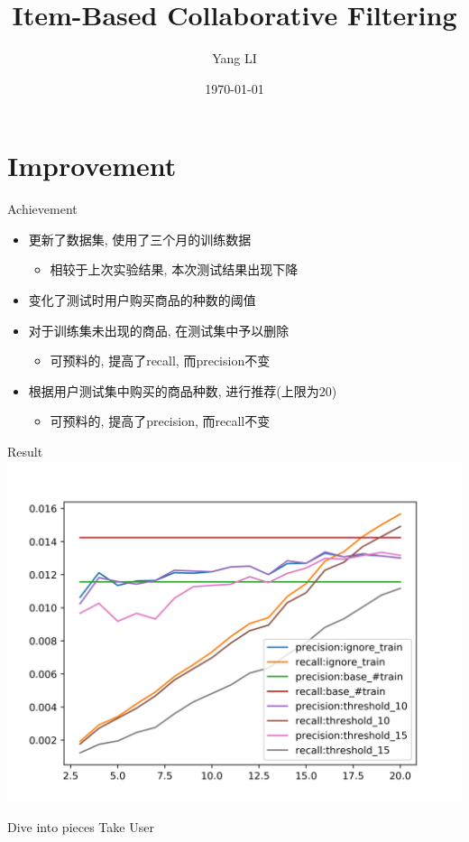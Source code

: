 \documentclass{beamer}
\title{Item-Based Collaborative Filtering}
\date{\today}
\author{Yang LI}
\institute{School of Software Engineering, Tongji University}
\begin{document}
  \maketitle
  \section{Improvement}
  \begin{frame}{Achievement}
    \begin{itemize}
      \item 更新了数据集, 使用了三个月的训练数据
      \begin{itemize}
        \item 相较于上次实验结果, 本次测试结果出现下降
      \end{itemize}
      \item 变化了测试时用户购买商品的种数的阈值
      \item 对于训练集未出现的商品, 在测试集中予以删除
      \begin{itemize}
        \item 可预料的, 提高了recall, 而precision不变
      \end{itemize}
      \item 根据用户测试集中购买的商品种数, 进行推荐(上限为$20$)
      \begin{itemize}
        \item 可预料的, 提高了precision, 而recall不变
      \end{itemize}
    \end{itemize}
  \end{frame}
  
  \begin{frame}{Result}
    \centering\includegraphics[width=\textwidth]{../result.png}
  \end{frame}
  
  \begin{frame}{Dive into pieces}
    Take User $$
  \end{frame}
\end{document}
